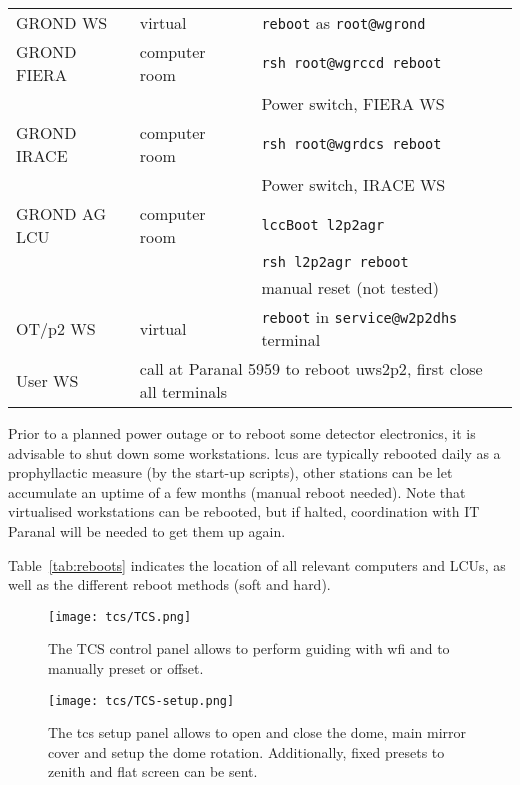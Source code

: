 \documentclass[11pt,fleqn,a4paper]{book}
\begin{document}
\begin{table}[t]
\begin{tabular}{lll}
\hline
GROND WS              & virtual       & \texttt{reboot} as \texttt{root@wgrond}\\
GROND FIERA           & computer room & \texttt{rsh root@\gls{wgrccd} reboot}\\
                      &               & Power switch, FIERA WS\\
GROND IRACE           & computer room & \texttt{rsh root@\gls{wgrdcs} reboot}\\
                      &               & Power switch, IRACE WS\\
GROND AG LCU          & computer room & \texttt{\gls{lccBoot} \gls{l2p2agr}}\\             
                      &               & \texttt{rsh \gls{l2p2agr} reboot}\\
                      &               & manual reset (not tested)\\
\hline
OT/p2 WS              & virtual       & \texttt{reboot} in \texttt{service@w2p2dhs} terminal\\
\hline
User WS               & \multicolumn{2}{l}{call at Paranal 5959 to reboot \gls{uws2p2}, first close all terminals}\\
\hline
\end{tabular}
\end{table}

Prior to a planned power outage or to reboot some detector electronics, it is advisable to shut down some workstations.  \glspl{lcu} are typically rebooted daily as a prophyllactic measure (by the start-up scripts), other stations can be let accumulate an uptime of a few months (manual reboot needed).  Note that virtualised workstations can be rebooted, but if halted, coordination with IT Paranal will be needed to get them up again.

Table~\ref{tab:reboots} indicates the location of all relevant computers and LCUs, as well as the different reboot methods (soft and hard).

\begin{figure}[!ht]
\centering
\texttt{[image: tcs/TCS.png]}
\caption[Main panel of the telescope control software]{The \gls{TCS control panel} allows to perform guiding with \gls{wfi} and to manually preset or offset.}
\label{fig:tcs}
\end{figure}

\begin{figure}[!ht]
\centering
\texttt{[image: tcs/TCS-setup.png]}
\caption[Setup panel of the telescope control software]{The \gls{tcs} setup panel allows to open and close the \gls{dome}, main
mirror cover and setup the \gls{dome} rotation.  Additionally, fixed presets
to zenith and flat screen can be sent.}
\label{fig:tcssetup}
\end{figure}
\end{document}

